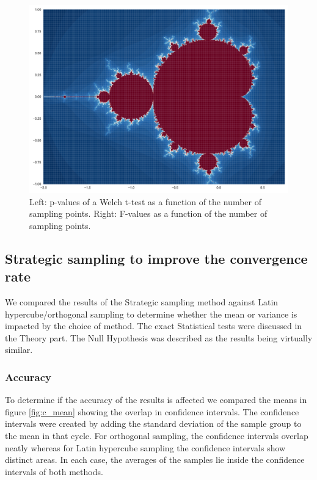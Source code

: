 \documentclass{uva-inf-article}
\begin{document}
\begin{figure}[h]
    \centering
   \includegraphics[width=.85\textwidth]{graphs/fractal.pdf}
    \caption{Left: p-values of a Welch t-test as a function of the number of sampling points. Right: F-values as a function of the number of sampling points.}
    \label{fig:stratified_stats}
\end{figure}


\subsection{Strategic sampling to improve the convergence rate}
We compared the results of the Strategic sampling method against Latin hypercube/orthogonal sampling to determine whether the mean or variance is impacted by the choice of method. The exact Statistical tests were discussed in the Theory part. The Null Hypothesis was described as the results being virtually similar.

\subsubsection{Accuracy}

To determine if the accuracy of the results is affected we compared the means in figure \ref{fig:c_mean} showing the overlap in confidence intervals. The confidence intervals were created by adding the standard deviation of the sample group to the mean in that cycle. For orthogonal sampling, the confidence intervals overlap neatly whereas for Latin hypercube sampling the confidence intervals show distinct areas. In each case, the averages of the samples lie inside the confidence intervals of both methods.\\
\end{document}

